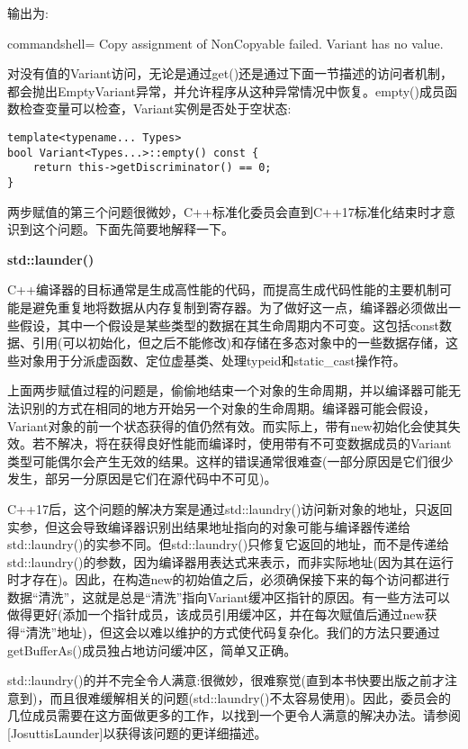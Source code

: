 输出为:

\begin{tcblisting}{commandshell={}}
Copy assignment of NonCopyable failed.
Variant has no value.
\end{tcblisting}

对没有值的Variant访问，无论是通过get()还是通过下面一节描述的访问者机制，都会抛出EmptyVariant异常，并允许程序从这种异常情况中恢复。empty()成员函数检查变量可以检查，Variant实例是否处于空状态:

\begin{lstlisting}[style=styleCXX]
template<typename... Types>
bool Variant<Types...>::empty() const {
	return this->getDiscriminator() == 0;
}
\end{lstlisting}

两步赋值的第三个问题很微妙，C++标准化委员会直到C++17标准化结束时才意识到这个问题。下面先简要地解释一下。

\noindent
\textbf{std::launder()}

C++编译器的目标通常是生成高性能的代码，而提高生成代码性能的主要机制可能是避免重复地将数据从内存复制到寄存器。为了做好这一点，编译器必须做出一些假设，其中一个假设是某些类型的数据在其生命周期内不可变。这包括const数据、引用(可以初始化，但之后不能修改)和存储在多态对象中的一些数据存储，这些对象用于分派虚函数、定位虚基类、处理typeid和static\_cast操作符。

上面两步赋值过程的问题是，偷偷地结束一个对象的生命周期，并以编译器可能无法识别的方式在相同的地方开始另一个对象的生命周期。编译器可能会假设，Variant对象的前一个状态获得的值仍然有效。而实际上，带有new初始化会使其失效。若不解决，将在获得良好性能而编译时，使用带有不可变数据成员的Variant类型可能偶尔会产生无效的结果。这样的错误通常很难查(一部分原因是它们很少发生，部另一分原因是它们在源代码中不可见)。

C++17后，这个问题的解决方案是通过std::laundry()访问新对象的地址，只返回实参，但这会导致编译器识别出结果地址指向的对象可能与编译器传递给std::laundry()的实参不同。但std::laundry()只修复它返回的地址，而不是传递给std::laundry()的参数，因为编译器用表达式来表示，而非实际地址(因为其在运行时才存在)。因此，在构造new的初始值之后，必须确保接下来的每个访问都进行数据“清洗”，这就是总是“清洗”指向Variant缓冲区指针的原因。有一些方法可以做得更好(添加一个指针成员，该成员引用缓冲区，并在每次赋值后通过new获得“清洗”地址)，但这会以难以维护的方式使代码复杂化。我们的方法只要通过getBufferAs()成员独占地访问缓冲区，简单又正确。

std::laundry()的并不完全令人满意:很微妙，很难察觉(直到本书快要出版之前才注意到)，而且很难缓解相关的问题(std::laundry()不太容易使用)。因此，委员会的几位成员需要在这方面做更多的工作，以找到一个更令人满意的解决办法。请参阅[JosuttisLaunder]以获得该问题的更详细描述。


